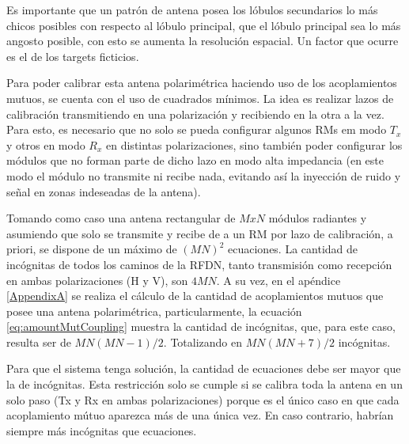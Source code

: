 Es importante que un patrón de antena posea los lóbulos secundarios lo más chicos posibles con respecto al lóbulo principal,
que el lóbulo principal sea lo más angosto posible, con esto se aumenta la resolución espacial. Un factor que ocurre es el 
de los targets ficticios.



Para poder calibrar esta antena polarimétrica haciendo uso de los acoplamientos mutuos, se cuenta con el uso de 
cuadrados mínimos. La idea es realizar lazos de calibración transmitiendo en una polarización y recibiendo en la
otra a la vez. Para esto, es necesario que no solo se pueda configurar algunos RMs em modo $T_x$ y otros en modo $R_x$ en 
distintas polarizaciones, sino también poder configurar los módulos que no forman parte de dicho lazo en modo alta 
impedancia (en este modo el módulo no transmite ni recibe nada, evitando así la inyección de ruido y señal en zonas 
indeseadas de la antena). 

Tomando como caso una antena rectangular de $M x N$ módulos radiantes y asumiendo que solo se transmite y recibe de a un 
RM por lazo de calibración, a priori, se dispone de un máximo de $(MN)^2$ ecuaciones. La cantidad de incógnitas de todos
los caminos de la RFDN, tanto transmisión como recepción en ambas polarizaciones (H y V), son $4MN$. A su vez, en el 
apéndice \ref{AppendixA} se realiza el cálculo de la cantidad de acoplamientos mutuos que posee una antena polarimétrica,
particularmente, la ecuación \ref{eq:amountMutCoupling} muestra la cantidad de incógnitas, que, para este caso, resulta 
ser de $MN(MN-1)/2$. Totalizando en $MN(MN + 7)/2$ incógnitas.

Para que el sistema tenga solución, la cantidad de ecuaciones debe ser mayor que la de incógnitas. Esta restricción solo 
se cumple si se calibra toda la antena en un solo paso (Tx y Rx en ambas polarizaciones) porque es el único caso en que 
cada acoplamiento mútuo aparezca más de una única vez. En caso contrario, habrían siempre más incógnitas que ecuaciones.





